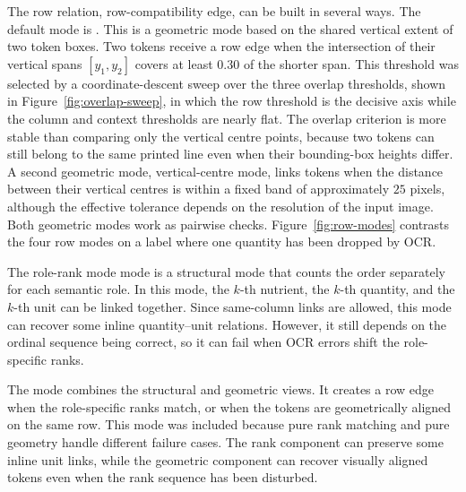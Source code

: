 The row relation,  row-compatibility edge, can be built in several ways. The default mode is . This is a geometric mode based on the shared vertical extent of two token boxes. Two tokens receive a row edge when the intersection of their vertical spans \([y_1, y_2]\) covers at least \(0.30\) of the shorter span. This threshold was selected by a coordinate-descent sweep over the three overlap thresholds, shown in Figure~\ref{fig:overlap-sweep}, in which the row threshold is the decisive axis while the column and context thresholds are nearly flat. The overlap criterion is more stable than comparing only the vertical centre points, because two tokens can still belong to the same printed line even when their bounding-box heights differ. A second geometric mode, vertical-centre mode, links tokens when the distance between their vertical centres is within a fixed band of approximately \(25\) pixels, although the effective tolerance depends on the resolution of the input image. Both geometric modes work as pairwise checks. Figure~\ref{fig:row-modes} contrasts the four row modes on a label where one quantity has been dropped by OCR.

The  role-rank mode mode is a structural mode that counts the order separately for each semantic role. In this mode, the \(k\)-th nutrient, the \(k\)-th quantity, and the \(k\)-th unit can be linked together. Since same-column links are allowed, this mode can recover some inline quantity--unit relations. However, it still depends on the ordinal sequence being correct, so it can fail when OCR errors shift the role-specific ranks.

The  mode combines the structural and geometric views. It creates a row edge when the role-specific ranks match, or when the tokens are geometrically aligned on the same row. This mode was included because pure rank matching and pure geometry handle different failure cases. The rank component can preserve some inline unit links, while the geometric component can recover visually aligned tokens even when the rank sequence has been disturbed.

